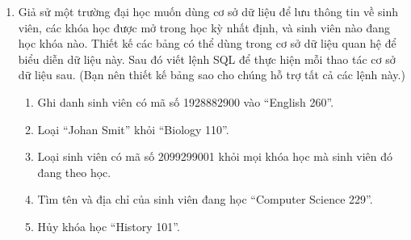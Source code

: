 \begin{enumerate}
\item[3.] Giả sử một trường đại học muốn dùng cơ sở dữ liệu để lưu thông tin về sinh viên, các khóa học được mở trong học kỳ nhất định, và sinh viên nào đang học khóa nào. Thiết kế các bảng có thể dùng trong cơ sở dữ liệu quan hệ để biểu diễn dữ liệu này. Sau đó viết lệnh SQL để thực hiện mỗi thao tác cơ sở dữ liệu sau. (Bạn nên thiết kế bảng sao cho chúng hỗ trợ tất cả các lệnh này.)
\begin{enumerate}[label=\alph*)]
\item Ghi danh sinh viên có mã số 1928882900 vào ``English 260''.
\item Loại ``Johan Smit'' khỏi ``Biology 110''.
\item Loại sinh viên có mã số 2099299001 khỏi mọi khóa học mà sinh viên đó đang theo học.
\item Tìm tên và địa chỉ của sinh viên đang học ``Computer Science 229''.
\item Hủy khóa học ``History 101''.
\end{enumerate}
\end{enumerate}
